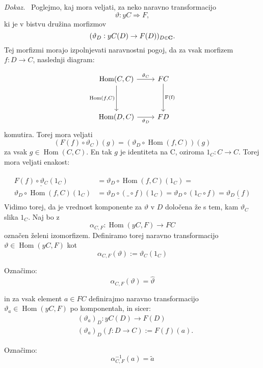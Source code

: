 \documentclass[12pt,a4paper]{book}
\theoremstyle{definition}
\theoremstyle{plain}
\newenvironment{dokaz}{\emph{Dokaz.}\ }{\hspace{\fill}{$\Box$}}
\theoremstyle{definition}
\theoremstyle{remark}
\DeclareMathOperator{\Hom}{Hom}
\begin{document}
\begin{dokaz}
Poglejmo, kaj mora veljati, za neko naravno transformacijo
$$\vartheta : yC \Rightarrow F,$$
ki je v bistvu družina morfizmov 
$$(\vartheta_D : yC(D) \to F(D))_{D \in \bf{C}}.$$
Tej morfizmi morajo izpolnjevati naravnostni pogoj, da za vsak morfizem $f : D \to C$, naslednji diagram:

\[ \begin{tikzcd}[row sep=huge]
\Hom(C,C) \arrow[r, "\vartheta_C"] \arrow[d, "{\Hom(f,C)}"'] & FC \arrow[d, "\text{F(f)}"] \\
\Hom(D,C) \arrow[r, "\vartheta_D"'] & FD
\end{tikzcd} \]
komutira. Torej mora veljati 
$$(F(f) \circ \vartheta_C) (g) = (\vartheta_D \circ \Hom(f,C)) (g)$$
za vsak $g \in \Hom(C,C)$. En tak $g$ je identiteta na C, oziroma $1_C : C \to C$. Torej mora veljati enakost:

\begin{align} \label{eq1}
\begin{split}
\underline{F(f) \circ \vartheta_C(1_C)}& = \vartheta_D \circ \Hom(f,C)(1_C) = \\
\vartheta_D \circ \Hom(f,C)(1_C)& = \vartheta_D \circ ( \_ \circ f )(1_C) =
\vartheta_D \circ ( 1_C \circ f) = \underline{\vartheta_D(f)}
\end{split}
\end{align}
Vidimo torej, da je vrednost komponente za $\vartheta$ v $D$ določena že s tem, kam $\vartheta_C$ slika $1_C$.
Naj bo z 
$$\alpha_{C,F} : \Hom(yC,F) \to FC$$ 
označen želeni izomorfizem.
Definiramo torej naravno transformacijo $\vartheta \in \Hom(yC,F)$ kot
\begin{equation}
\alpha_{C,F}(\vartheta) := \vartheta_C(1_C)
\end{equation}

Označimo:
\begin{equation}
\boxed{\alpha_{C,F}(\vartheta) = \widehat{\vartheta}}
\end{equation} 

in za vsak element $a \in FC$ definirajmo naravno transformacijo $\vartheta_a \in \Hom(yC,F)$ po komponentah, in sicer:
\begin{align}
&(\vartheta_a)_D : yC(D) \to F(D) \\
&(\vartheta_a)_D(f : D \to C) := F(f)(a).
\end{align}

Označimo:
\begin{equation}
\boxed{\alpha^{-1}_{C,F}(a) = \widetilde{a}}
\end{equation}


\end{dokaz}
\end{document}
